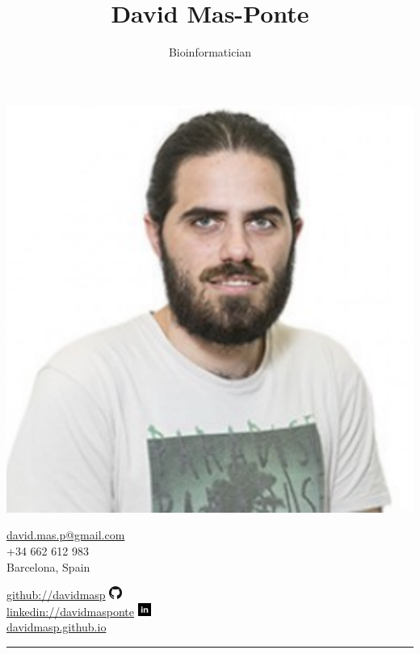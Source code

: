 \documentclass[10pt,a4paper]{article} %
\title{\bfseries\Huge David Mas-Ponte}
\author{Bioinformatician}
\date{}
\begin{document}
\begin{minipage}[c]{0.65\textwidth}
\maketitle
\end{minipage}
\begin{minipage}[c]{0.3\textwidth}
  \includegraphics[width=.55\textwidth]{profile}
\end{minipage}


\begin{minipage}[c]{0.65\textwidth}
  \begin{center}
    \href{mailto:david.mas.p@gmail.com}{david.mas.p@gmail.com}\\
    +34 662 612 983\\
    Barcelona, Spain
  \end{center}
\end{minipage}
\begin{minipage}[c]{0.3\textwidth}
\href{https://github.com/davidmasp}{github://davidmasp}
\includegraphics[height=12pt]{gh}\\
\href{https://www.linkedin.com/in/davidmasponte/}{linkedin://davidmasponte}
\includegraphics[height=12pt]{in}\\
\href{https://davidmasp.github.io}{davidmasp.github.io}
\end{minipage}


\vspace{0.75cm}
\rule{.9\textwidth}{0.6pt}
\end{document}

